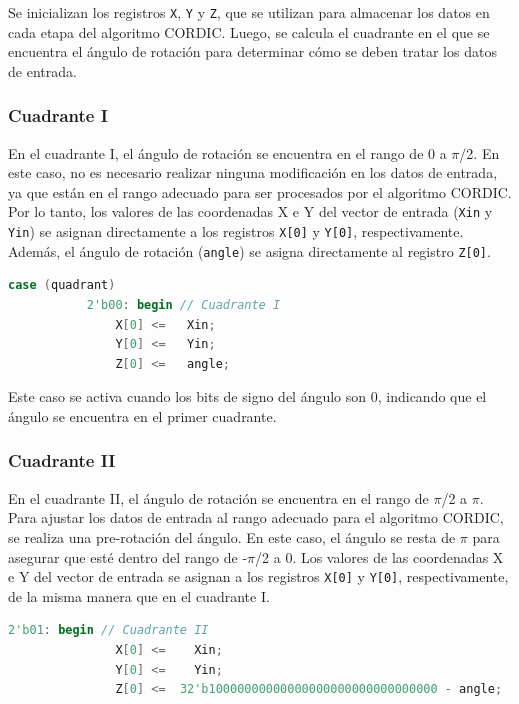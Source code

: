 \documentclass[12pt,a4paper, twoside]{article} %
\begin{document}
Se inicializan los registros \texttt{X}, \texttt{Y} y \texttt{Z}, que se utilizan para almacenar los datos en cada etapa del algoritmo CORDIC. Luego, se calcula el cuadrante en el que se encuentra el ángulo de rotación para determinar cómo se deben tratar los datos de entrada.

\subsubsection{Cuadrante I}

En el cuadrante I, el ángulo de rotación se encuentra en el rango de 0 a $\pi$/2. En este caso, no es necesario realizar ninguna modificación en los datos de entrada, ya que están en el rango adecuado para ser procesados por el algoritmo CORDIC. Por lo tanto, los valores de las coordenadas X e Y del vector de entrada (\texttt{Xin} y \texttt{Yin}) se asignan directamente a los registros \texttt{X[0]} y \texttt{Y[0]}, respectivamente. Además, el ángulo de rotación (\texttt{angle}) se asigna directamente al registro \texttt{Z[0]}.

\begin{lstlisting}[language=Verilog]
       case (quadrant)
           2'b00: begin // Cuadrante I
               X[0] <=   Xin;
               Y[0] <=   Yin;
               Z[0] <=   angle;
\end{lstlisting}

Este caso se activa cuando los bits de signo del ángulo son 0, indicando que el ángulo se encuentra en el primer cuadrante.

\subsubsection{Cuadrante II}

En el cuadrante II, el ángulo de rotación se encuentra en el rango de $\pi$/2 a $\pi$. Para ajustar los datos de entrada al rango adecuado para el algoritmo CORDIC, se realiza una pre-rotación del ángulo. En este caso, el ángulo se resta de $\pi$ para asegurar que esté dentro del rango de -$\pi$/2 a 0. Los valores de las coordenadas X e Y del vector de entrada se asignan a los registros \texttt{X[0]} y \texttt{Y[0]}, respectivamente, de la misma manera que en el cuadrante I.

\begin{lstlisting}[language=Verilog]
       2'b01: begin // Cuadrante II
               X[0] <=    Xin;
               Y[0] <=    Yin;
               Z[0] <=  32'b10000000000000000000000000000000 - angle;                  
\end{lstlisting}
\end{document}
